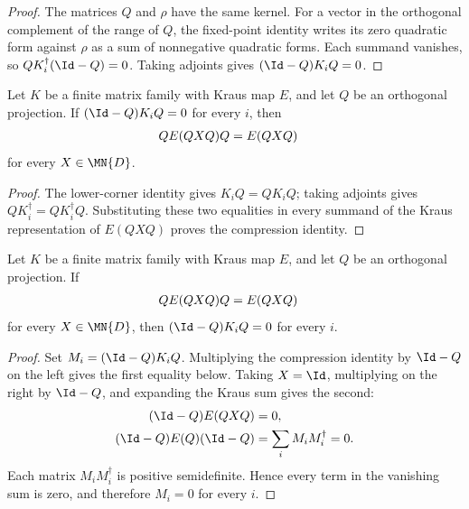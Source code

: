\begin{proof}
    \leanok
    The matrices $Q$ and $\rho$ have the same kernel. For a vector in the
    orthogonal complement of the range of $Q$, the fixed-point identity writes
    its zero quadratic form against $\rho$ as a sum of nonnegative quadratic
    forms. Each summand vanishes, so $QK_i^\dagger(\Id-Q)=0$. Taking adjoints
    gives $(\Id-Q)K_iQ=0$.
\end{proof}

\begin{theorem}
    \label{thm:kraus_lower_zero_invariant_compression}
    \leanok
    Let $K$ be a finite matrix family with Kraus map $E$, and let $Q$ be an
    orthogonal projection. If $(\Id-Q)K_iQ=0$ for every $i$, then
    \begin{align}
        Q E(QXQ)Q
         & =E(QXQ)
        \notag
    \end{align}
    for every $X\in\MN{D}$.
\end{theorem}

\begin{proof}
    \leanok
    The lower-corner identity gives $K_iQ=QK_iQ$; taking adjoints gives
    $QK_i^\dagger=QK_i^\dagger Q$. Substituting these two equalities in every
    summand of the Kraus representation of $E(QXQ)$ proves the compression
    identity.
\end{proof}

\begin{theorem}
    \label{thm:kraus_invariant_compression_lower_zero}
    \leanok
    Let $K$ be a finite matrix family with Kraus map $E$, and let $Q$ be an
    orthogonal projection. If
    \begin{align}
        Q E(QXQ)Q
         & =E(QXQ)
        \notag
    \end{align}
    for every $X\in\MN{D}$, then $(\Id-Q)K_iQ=0$ for every $i$.
\end{theorem}

\begin{proof}
    \leanok
    Set $M_i=(\Id-Q)K_iQ$. Multiplying the compression identity by $\Id-Q$
    on the left gives the first equality below. Taking $X=\Id$, multiplying on
    the right by $\Id-Q$, and expanding the Kraus sum gives the second:
    \begin{align}
        (\Id-Q)E(QXQ)
         & =0,
        \notag\\
        (\Id-Q)E(Q)(\Id-Q)
         & =\sum_i M_iM_i^\dagger=0.
        \notag
    \end{align}
    Each matrix $M_iM_i^\dagger$ is positive semidefinite. Hence every term in
    the vanishing sum is zero, and therefore $M_i=0$ for every $i$.
\end{proof}

